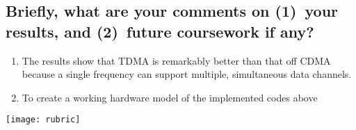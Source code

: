 \subsection{Briefly, what are your comments on (1)~your results, and  (2)~future coursework if any?}
\begin{enumerate}
	\item The results show that TDMA is remarkably better than that off CDMA because a single frequency can support multiple, simultaneous data channels.
	\item To create a working hardware model of the implemented codes above
\end{enumerate}	




\newpage
\begin{figure*}[!t]
	\texttt{[image: rubric]} 
\end{figure*}
\cleardoublepage

